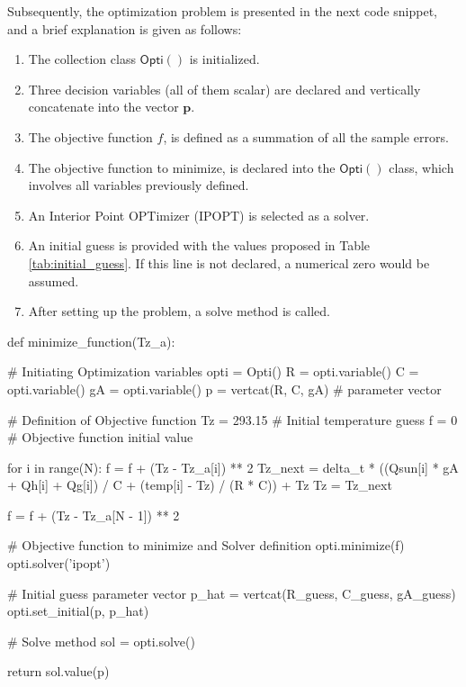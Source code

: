Subsequently, the optimization problem is presented in the next code snippet, and a brief explanation is given as follows:
\begin{enumerate}
  \itemsep0em 
  \item The collection class $\mathsf{Opti()}$ is initialized.
  \item Three decision variables (all of them scalar) are declared and vertically concatenate into the vector $\mathbf{p}$.
  \item The objective function $f$, is defined as a summation of all the sample errors.
  \item The objective function to minimize, is declared into the $\mathsf{Opti()}$ class, which involves all variables previously defined.
  \item An Interior Point OPTimizer (IPOPT) is selected as a solver.
  \item An initial guess is provided with the values proposed in Table \ref{tab:initial_guess}. If this line is not declared, a numerical zero would be assumed.
  \item After setting up the problem, a solve method is called. 

\end{enumerate}

\begin{python}
def minimize_function(Tz_a):
   
    # Initiating Optimization variables
    opti = Opti()
    R = opti.variable()
    C = opti.variable()
    gA = opti.variable()
    p = vertcat(R, C, gA)  # parameter vector

	  # Definition of Objective function
    Tz = 293.15  # Initial temperature guess
    f = 0   # Objective function initial value

    for i in range(N):
        f = f + (Tz - Tz_a[i]) ** 2
        Tz_next = delta_t * ((Qsun[i] * gA + Qh[i] + Qg[i]) / C + (temp[i] - Tz) / (R * C)) + Tz
        Tz = Tz_next
        
    f = f + (Tz - Tz_a[N - 1]) ** 2

	  # Objective function to minimize and Solver definition
    opti.minimize(f)
    opti.solver('ipopt')

    # Initial guess parameter vector
    p_hat = vertcat(R_guess, C_guess, gA_guess)
    opti.set_initial(p, p_hat)

	  # Solve method
    sol = opti.solve()

    return sol.value(p)
\end{python}


